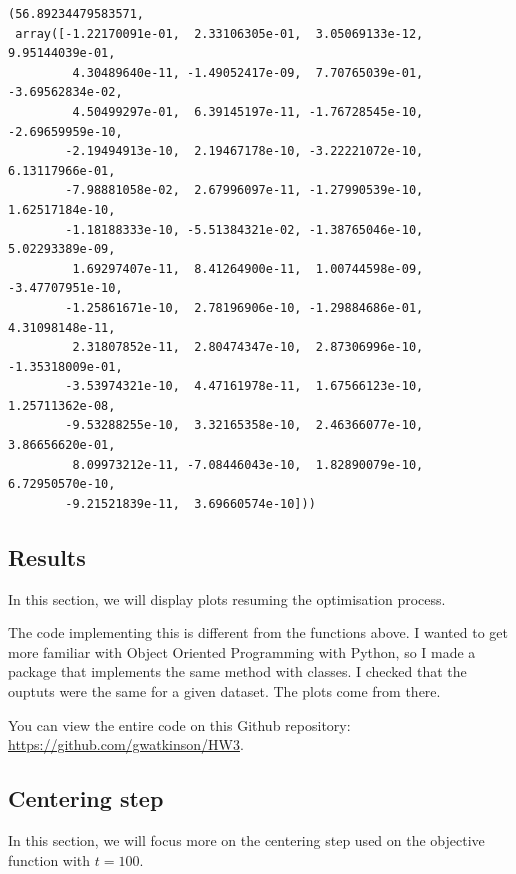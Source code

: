 \documentclass[11pt]{article}
\makeatletter
\newcommand{\boxspacing}{\kern\kvtcb@left@rule\kern\kvtcb@boxsep}
\newcommand{\prompt}[4]{
        {\ttfamily\llap{{\color{#2}[#3]:\hspace{3pt}#4}}\vspace{-\baselineskip}}
    }
\makeatother
\begin{document}
            \begin{tcolorbox}[breakable, size=fbox, boxrule=.5pt, pad at break*=1mm, opacityfill=0]
\prompt{Out}{outcolor}{207}{\boxspacing}
\begin{Verbatim}[commandchars=\\\{\}]
(56.89234479583571,
 array([-1.22170091e-01,  2.33106305e-01,  3.05069133e-12,  9.95144039e-01,
         4.30489640e-11, -1.49052417e-09,  7.70765039e-01, -3.69562834e-02,
         4.50499297e-01,  6.39145197e-11, -1.76728545e-10, -2.69659959e-10,
        -2.19494913e-10,  2.19467178e-10, -3.22221072e-10,  6.13117966e-01,
        -7.98881058e-02,  2.67996097e-11, -1.27990539e-10,  1.62517184e-10,
        -1.18188333e-10, -5.51384321e-02, -1.38765046e-10,  5.02293389e-09,
         1.69297407e-11,  8.41264900e-11,  1.00744598e-09, -3.47707951e-10,
        -1.25861671e-10,  2.78196906e-10, -1.29884686e-01,  4.31098148e-11,
         2.31807852e-11,  2.80474347e-10,  2.87306996e-10, -1.35318009e-01,
        -3.53974321e-10,  4.47161978e-11,  1.67566123e-10,  1.25711362e-08,
        -9.53288255e-10,  3.32165358e-10,  2.46366077e-10,  3.86656620e-01,
         8.09973212e-11, -7.08446043e-10,  1.82890079e-10,  6.72950570e-10,
        -9.21521839e-11,  3.69660574e-10]))
\end{Verbatim}
\end{tcolorbox}
        
    \hypertarget{results}{%
\subsection{Results}\label{results}}

In this section, we will display plots resuming the optimisation
process.

The code implementing this is different from the functions above. I
wanted to get more familiar with Object Oriented Programming with
Python, so I made a package that implements the same method with
classes. I checked that the ouptuts were the same for a given dataset.
The plots come from there.

You can view the entire code on this Github repository:
\url{https://github.com/gwatkinson/HW3}.

    \hypertarget{centering-step}{%
\subsection{Centering step}\label{centering-step}}

In this section, we will focus more on the centering step used on the
objective function with \(t=100\).
\end{document}
